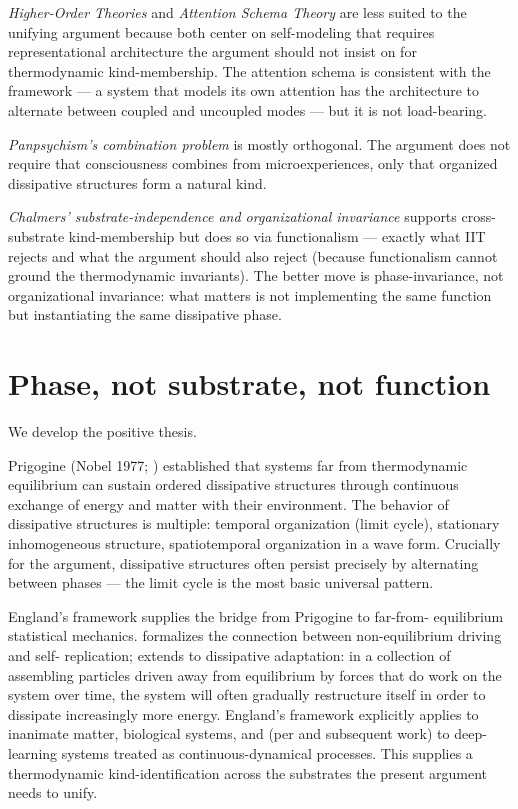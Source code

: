 \documentclass[11pt]{article}
\begin{document}
\emph{Higher-Order Theories} \cite{brown2019hot} and \emph{Attention
Schema Theory} \cite{graziano2013attentionschema} are less suited to
the unifying argument because both center on self-modeling that requires
representational architecture the argument should not insist on for
thermodynamic kind-membership. The attention schema is consistent with
the framework --- a system that models its own attention has the
architecture to alternate between coupled and uncoupled modes --- but
it is not load-bearing.

\emph{Panpsychism's combination problem} \cite{chalmers2017combination,
goff2017panpsychism} is mostly orthogonal. The argument does not
require that consciousness combines from microexperiences, only that
organized dissipative structures form a natural kind.

\emph{Chalmers' substrate-independence and organizational invariance}
\cite{chalmers1995substrate} supports cross-substrate kind-membership
but does so via functionalism --- exactly what IIT rejects and what
the argument should also reject (because functionalism cannot ground
the thermodynamic invariants). The better move is phase-invariance,
not organizational invariance: what matters is not implementing the
same function but instantiating the same dissipative phase.

\section{Phase, not substrate, not function}

We develop the positive thesis.

Prigogine (Nobel 1977; \cite{nicolis1977prigogine}) established that
systems far from thermodynamic equilibrium can sustain ordered
dissipative structures through continuous exchange of energy and matter
with their environment. The behavior of dissipative structures is
multiple: temporal organization (limit cycle), stationary inhomogeneous
structure, spatiotemporal organization in a wave form. Crucially for
the argument, dissipative structures often persist precisely by
alternating between phases --- the limit cycle is the most basic
universal pattern.

England's framework supplies the bridge from Prigogine to far-from-
equilibrium statistical mechanics. \cite{england2013replication}
formalizes the connection between non-equilibrium driving and self-
replication; \cite{england2015dissipative} extends to dissipative
adaptation: in a collection of assembling particles driven away from
equilibrium by forces that do work on the system over time, the system
will often gradually restructure itself in order to dissipate
increasingly more energy. England's framework explicitly applies to
inanimate matter, biological systems, and (per
\cite{perez2017dissipative} and subsequent work) to deep-learning
systems treated as continuous-dynamical processes. This supplies a
thermodynamic kind-identification across the substrates the present
argument needs to unify.
\end{document}
